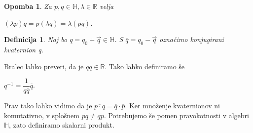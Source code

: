 \documentclass[a4paper,12pt]{article}
\def\R{\mathbb{R}} %
\def\H{\mathbb{H}} %
\def\1{\textbf{1}}
\newcommand{\conj}[1]{\overline{#1}}
\newtheorem{opomba}{Opomba}
\newtheorem{definicija}{Definicija}
\begin{document}

\begin{opomba}
Za $p,q \in \H, \lambda \in \R$ velja
\begin{center}
      $(\lambda p)q = p(\lambda q) = \lambda (pq)$.
\end{center}
\end{opomba}
\begin{definicija}
Naj bo $q = q_{0} + \vec{q}\in \H$. S $\overline{q} = q_{0} -\vec{q}$ označimo \emph{konjugirani kvaternion} q.
\end{definicija}
Bralec lahko preveri, da je $q\conj{q} \in \R$. Tako lahko definiramo še 
\begin{center}
   $q^{-1} = \dfrac{1}{q\overline{q}} \overline{q}$.
\end{center}
Prav tako lahko vidimo da je $\overline{p \cdot q} = \overline{q} \cdot \overline{p}$. Ker množenje kvaternionov ni komutativno,
v splošnem $\overline{pq} \neq \overline{qp}$. Potrebujemo še pomen pravokotnosti v algebri $\H$, zato definiramo skalarni produkt.
\end{document}

